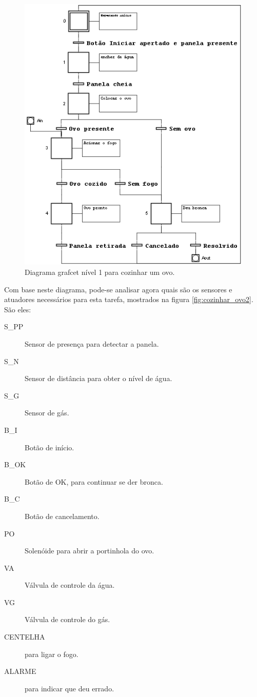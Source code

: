 \begin{figure}[!h]
\centering
\includegraphics[scale=1]{figuras/ovoNivel1}

\caption{Diagrama grafcet nível 1 para cozinhar um ovo.}
\label{fig:grafcetOvo1}
\end{figure}

Com base neste diagrama, pode-se analisar agora quais são os sensores e atuadores necessários para esta tarefa, mostrados na figura \ref{fig:cozinhar_ovo2}. São eles:

\begin{description}
  \item[S\_PP] Sensor de presença para detectar a panela.
  \item[S\_N] Sensor de distância para obter o nível de água.
  \item[S\_G] Sensor de gás.
  \item[B\_I] Botão de início.
  \item[B\_OK] Botão de OK, para continuar se der bronca.
  \item[B\_C] Botão de cancelamento.
  \item[PO] Solenóide para abrir a portinhola do ovo.
  \item[VA] Válvula de controle da água.
  \item[VG] Válvula de controle do gás.
  \item[CENTELHA] para ligar o fogo.
  \item[ALARME] para indicar que deu errado.
\end{description}

